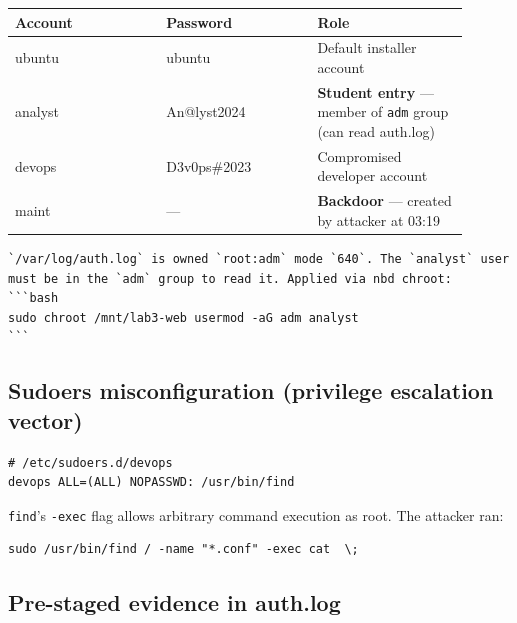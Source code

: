 {\footnotesize\begin{longtable}[]{@{}
  >{\raggedright\arraybackslash}p{0.30\linewidth}
  >{\raggedright\arraybackslash}p{0.30\linewidth}
  >{\raggedright\arraybackslash}p{0.30\linewidth}@{}}
\toprule\noalign{}
\begin{minipage}[b]{\linewidth}\raggedright
Account
\end{minipage} & \begin{minipage}[b]{\linewidth}\raggedright
Password
\end{minipage} & \begin{minipage}[b]{\linewidth}\raggedright
Role
\end{minipage} \\
\midrule\noalign{}
\endhead
\bottomrule\noalign{}
\endlastfoot
ubuntu & ubuntu & Default installer account \\
analyst & An@lyst2024 & \textbf{Student entry} --- member of \texttt{adm} group (can read auth.log) \\
devops & D3v0ps\#2023 & Compromised developer account \\
maint & --- & \textbf{Backdoor} --- created by attacker at 03:19 \\
\end{longtable}}

\begin{lstlisting}
`/var/log/auth.log` is owned `root:adm` mode `640`. The `analyst` user must be in the `adm` group to read it. Applied via nbd chroot:
```bash
sudo chroot /mnt/lab3-web usermod -aG adm analyst
```
\end{lstlisting}

\subsection{Sudoers misconfiguration (privilege escalation vector)}

\begin{lstlisting}
# /etc/sudoers.d/devops
devops ALL=(ALL) NOPASSWD: /usr/bin/find
\end{lstlisting}

\texttt{find}'s \texttt{-exec} flag allows arbitrary command execution as root. The attacker ran:

\begin{lstlisting}
sudo /usr/bin/find / -name "*.conf" -exec cat  \;
\end{lstlisting}

\subsection{Pre-staged evidence in auth.log}

